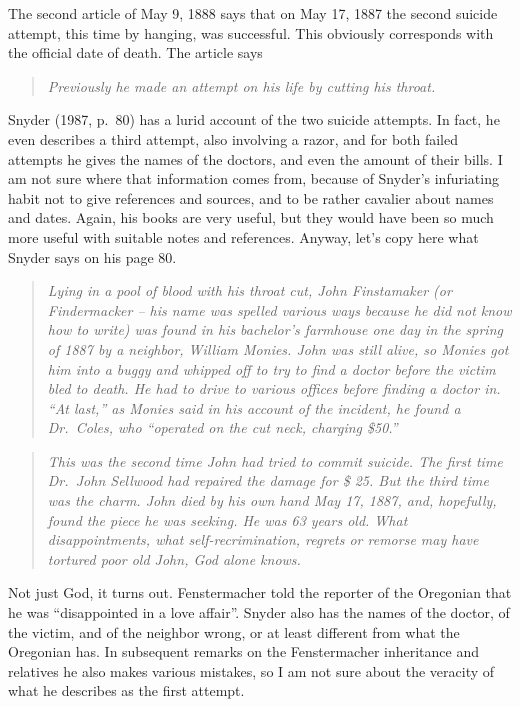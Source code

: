 \documentclass[
  12pt,
]{book}
\begin{document}
The second article of May 9, 1888 says that on May 17, 1887 the second suicide attempt, this time by hanging, was successful. This obviously corresponds with the official date of death. The article says

\begin{quote}
\emph{Previously he made an attempt on his life by cutting his throat. }
\end{quote}

Snyder (1987, p.~80) has a lurid account of the two suicide attempts. In fact, he even describes a third attempt, also involving a razor, and for both failed attempts he gives the names of the doctors, and even the amount of their bills. I am not sure where that information comes from, because of Snyder's infuriating habit not to give references and sources, and to be rather cavalier about names and dates. Again, his books are very useful, but they would have been so much more useful with suitable notes and references. Anyway, let's copy here what Snyder says on his page 80.

\begin{quote}
\emph{Lying in a pool of blood with his throat cut, John Finstamaker (or Findermacker -- his name was spelled various ways because he did not know how to write) was found in his bachelor's farmhouse one day in the spring of 1887 by a neighbor, William Monies. John was still alive, so Monies got him into a buggy and whipped off to try to find a doctor before the victim bled to death. He had to drive to various offices before finding a doctor in. ``At last,'' as Monies said in his account of the incident, he found a Dr.~Coles, who ``operated on the cut neck, charging \$50.''}
\end{quote}

\begin{quote}
\emph{This was the second time John had tried to commit suicide. The first time Dr.~John Sellwood had repaired the damage for \$ 25. But the third time was the charm. John died by his own hand May 17, 1887, and, hopefully, found the piece he was seeking. He was 63 years old. What disappointments, what self-recrimination, regrets or remorse may have tortured poor old John, God alone knows. }
\end{quote}

Not just God, it turns out. Fenstermacher told the reporter of the Oregonian that he was ``disappointed in a love affair''. Snyder also has the names of the doctor, of the victim, and of the neighbor wrong, or at least different from what the Oregonian has. In subsequent remarks on the Fenstermacher inheritance and relatives he also makes various mistakes, so I am not sure about the veracity of what he describes as the first attempt.
\end{document}

